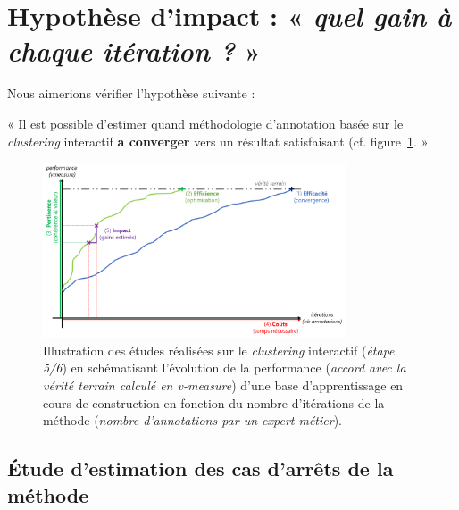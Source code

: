     \section{Hypothèse d'impact : « \textit{quel gain à chaque itération ?} »}
	\label{section:4.5-HYPOTHESE-IMPACT}
	
		Nous aimerions vérifier l'hypothèse suivante :

		\begin{tcolorbox}[
			title=\textbf{Hypothèse d'impact},
			colback=gray!20,
			colframe=gray!50!black!75,
			width=\linewidth
		]
			« Il est possible d'estimer quand méthodologie d'annotation basée sur le \textit{clustering} interactif \textbf{a converger} vers un résultat satisfaisant (cf. figure~\ref{figure:HYPOTHESE-IMPACT}. »
			
			
			\begin{figure}[H]
				\centering
				\includegraphics[width=0.8\textwidth]{figures/hypotheses-05-impact}
				\caption{Illustration des études réalisées sur le \textit{clustering} interactif (\textit{étape 5/6}) en schématisant l'évolution de la performance (\textit{accord avec la vérité terrain calculé en v-measure}) d'une base d'apprentissage en cours de construction en fonction du nombre d'itérations de la méthode (\textit{nombre d'annotations par un expert métier}).}
				\label{figure:HYPOTHESE-IMPACT}
			\end{figure}

		\end{tcolorbox}
		
		\subsection{Étude d'estimation des cas d'arrêts de la méthode}
		
